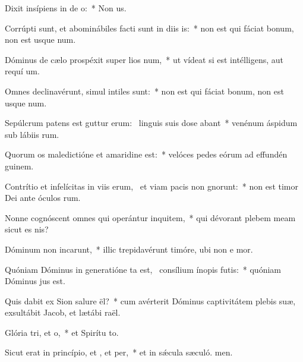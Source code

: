 \item Dixit insípiens in de o:~* Non  us.
\item Corrúpti sunt, et abominábiles facti sunt in diis is:~* non est qui fáciat bonum, non est usque  num.
\item Dóminus de cælo prospéxit super lios num,~* ut vídeat si est intélligens, aut requí um.
\item Omnes declinavérunt, simul intiles  sunt:~* non est qui fáciat bonum, non est usque  num.
\item Sepúlcrum patens est guttur erum:~\pscross{} linguis suis dose abant~* venénum áspidum sub lábiis rum.
\item Quorum os maledictióne et amaridine  est:~* velóces pedes eórum ad effundén guinem.
\item Contrítio et infelícitas in viis erum,~\pscross{} et viam pacis non gnorunt:~* non est timor Dei ante óculos rum.
\item Nonne cognóscent omnes qui operántur inquitem,~* qui dévorant plebem meam sicut es nis?
\item Dóminum non incarunt,~* illic trepidavérunt timóre, ubi non e mor.
\item Quóniam Dóminus in generatióne ta est,~\pscross{} consílium ínopis futis:~* quóniam Dóminus  jus est.
\item Quis dabit ex Sion salure ël?~* cum avérterit Dóminus captivitátem plebis suæ, exsultábit Jacob, et lætábi raël.
\item Glória tri, et o,~* et Spirítu to.
\item Sicut erat in princípio, et , et per,~* et in sǽcula sæculó. men.
